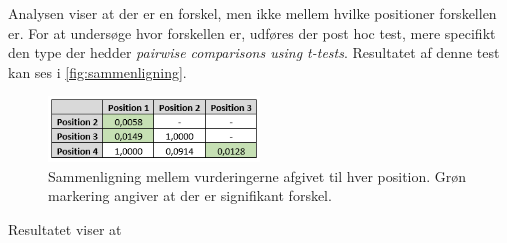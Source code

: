 Analysen viser at der er en forskel, men ikke mellem hvilke positioner forskellen er. For at undersøge hvor forskellen er, udføres der post hoc test, mere specifikt den type der hedder \textit{pairwise comparisons using t-tests}. Resultatet af denne test kan ses i \autoref{fig:sammenligning}.
\begin{figure}[H]
\centering
\includegraphics[width = 0.5\textwidth]{Figure/PostHocExcel.PNG} 
\caption{Sammenligning mellem vurderingerne afgivet til hver position. Grøn markering angiver at der er signifikant forskel.}
\label{fig:sammenligning}
\end{figure}

Resultatet viser at 